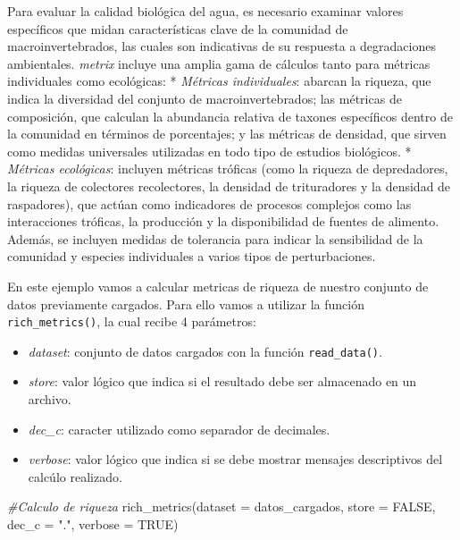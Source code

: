 \documentclass[
]{book}
\newenvironment{Shaded}{\begin{snugshade}}{\end{snugshade}}
\newcommand{\AttributeTok}[1]{\textcolor[rgb]{0.77,0.63,0.00}{#1}}
\newcommand{\CommentTok}[1]{\textcolor[rgb]{0.56,0.35,0.01}{\textit{#1}}}
\newcommand{\ConstantTok}[1]{\textcolor[rgb]{0.00,0.00,0.00}{#1}}
\newcommand{\FunctionTok}[1]{\textcolor[rgb]{0.00,0.00,0.00}{#1}}
\newcommand{\NormalTok}[1]{#1}
\newcommand{\StringTok}[1]{\textcolor[rgb]{0.31,0.60,0.02}{#1}}
\providecommand{\tightlist}{%
  \setlength{\itemsep}{0pt}\setlength{\parskip}{0pt}}
\begin{document}
Para evaluar la calidad biológica del agua, es necesario examinar valores específicos que midan características clave de la comunidad de macroinvertebrados, las cuales son indicativas de su respuesta a degradaciones ambientales.
\emph{metrix} incluye una amplia gama de cálculos tanto para métricas individuales como ecológicas: * \emph{Métricas individuales}: abarcan la riqueza, que indica la diversidad del conjunto de macroinvertebrados; las métricas de composición, que calculan la abundancia relativa de taxones específicos dentro de la comunidad en términos de porcentajes; y las métricas de densidad, que sirven como medidas universales utilizadas en todo tipo de estudios biológicos.
* \emph{Métricas ecológicas}: incluyen métricas tróficas (como la riqueza de depredadores, la riqueza de colectores recolectores, la densidad de trituradores y la densidad de raspadores), que actúan como indicadores de procesos complejos como las interacciones tróficas, la producción y la disponibilidad de fuentes de alimento.
Además, se incluyen medidas de tolerancia para indicar la sensibilidad de la comunidad y especies individuales a varios tipos de perturbaciones.

En este ejemplo vamos a calcular metricas de riqueza de nuestro conjunto de datos previamente cargados.
Para ello vamos a utilizar la función \texttt{rich\_metrics()}, la cual recibe 4 parámetros:

\begin{itemize}
\tightlist
\item
  \emph{dataset}: conjunto de datos cargados con la función \texttt{read\_data()}.
\item
  \emph{store}: valor lógico que indica si el resultado debe ser almacenado en un archivo.
\item
  \emph{dec\_c}: caracter utilizado como separador de decimales.
\item
  \emph{verbose}: valor lógico que indica si se debe mostrar mensajes descriptivos del calcúlo realizado.
\end{itemize}

\begin{Shaded}
\begin{Highlighting}[]
\CommentTok{\#Calculo de riqueza}
\FunctionTok{rich\_metrics}\NormalTok{(}\AttributeTok{dataset =}\NormalTok{ datos\_cargados, }\AttributeTok{store =} \ConstantTok{FALSE}\NormalTok{, }\AttributeTok{dec\_c =} \StringTok{"."}\NormalTok{, }\AttributeTok{verbose =} \ConstantTok{TRUE}\NormalTok{)}
\end{Highlighting}
\end{Shaded}
\end{document}
